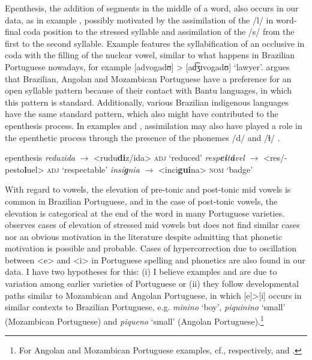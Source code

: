 \documentclass[output=paper,colorlinks,citecolor=brown]{langscibook}
\begin{document}
Epenthesis, the addition of segments in the middle of a word, also occurs in our data, as in example , possibly motivated by the assimilation of the /l/ in word-final coda position to the stressed syllable and assimilation of the /s/ from the first to the second syllable. Example  features the syllabification of an occlusive in coda with the filling of the nuclear vowel, similar to what happens in Brazilian Portuguese nowadays, for example [advogadʊ] > [ad͡ʒɪvogadʊ] ‘lawyer’. \citet[161]{Petter_2009} argues that Brazilian, Angolan and Mozambican Portuguese  have a preference for an open syllable pattern because of their contact with Bantu languages, in which this pattern is standard. Additionally, various Brazilian indigenous languages have the same standard pattern, which also might have contributed to the epenthesis process. In examples  and , assimilation may also have played a role in the epenthetic process through the presence of the phonemes /d/  and /ɫ/ .

\ea\label{ex:6:11-1} epenthesis
\ea\label{ex:6:11-1a}\emph{reduzida} $\rightarrow$ <rudu\textbf{di}z/ida> \textsc{adj} ‘reduced’
\ex\label{ex:6:11-1b}\emph{resp\textbf{ei}t\textbf{á}vel} $\rightarrow$ <res/-pesto\textbf{l}uel> \textsc{adj} ‘respectable’
\ex\label{ex:6:11-1c}\emph{insí\textbf{g}nia} $\rightarrow$ <inci\textbf{gui}na> \textsc{nom} ‘badge’
    \z   
\z

With regard to vowels, the elevation of pre-tonic and post-tonic mid vowels is common in Brazilian Portuguese, and in the case of post-tonic vowels, the elevation is categorical at the end of the word in many Portuguese varieties. \citet[367]{Oliveira_2006} observes cases of elevation of stressed mid vowels  but does not find similar cases nor an obvious motivation in the literature despite admitting that phonetic motivation is possible and probable. Cases of hypercorrection due to oscillation between <e> and <i> in Portuguese spelling and phonetics are also found in our data. I have two hypotheses for this: (i) I believe examples  and  are due to variation among earlier varieties of Portuguese \citep{Graebin_2017} or (ii) they follow developmental paths similar to Mozambican and Angolan Portuguese, in which [e]>[i] occurs in similar contexts to Brazilian Portuguese, e.g. \emph{minino} ‘boy’, \emph{piquinino} ‘small’ (Mozambican Portuguese) and \emph{piqueno} ‘small’ (Angolan Portuguese).\footnote{For Angolan and Mozambican Portuguese examples, cf., respectively, \citet{Chavagne_2005} and \citet{Laban_1999}.}
\end{document}
